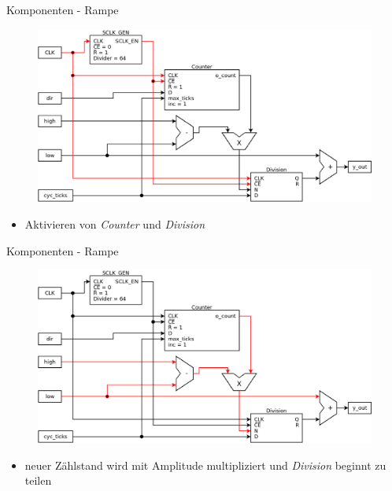 \documentclass[11pt]{beamer}
\begin{document}
\begin{frame}[t]{Komponenten - Rampe}
  \begin{figure}
    \includegraphics[scale=0.28]{ramp_step1}
  \end{figure}
  \begin{itemize}
    \item Aktivieren von \emph{Counter} und \emph{Division}
  \end{itemize}
\end{frame}

\begin{frame}[t]{Komponenten - Rampe}
  \begin{figure}
    \includegraphics[scale=0.28]{ramp_step2}
  \end{figure}
  \begin{itemize}
    \item neuer Zählstand wird mit Amplitude multipliziert und \emph{Division} beginnt zu teilen
  \end{itemize}
\end{frame}
\end{document}
